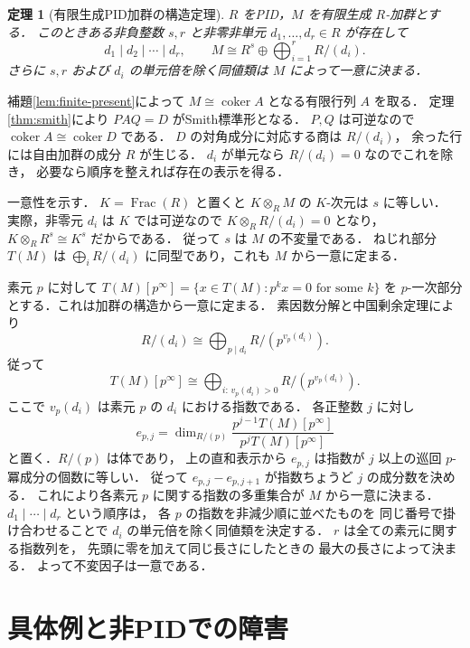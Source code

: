 \documentclass[a5paper,10pt,onecolumn]{jsarticle}
\makeatletter
\theoremstyle{mathnotetheorem}
\newtheorem{theorem}{定理}[section]
\renewcommand{\proofname}{証明}
\renewenvironment{proof}[1][\proofname]{%
  \par\pushQED{\qed}\normalfont\topsep4\p@\@plus2\p@\relax
  \trivlist\item[\hskip\labelsep\bfseries #1]\ignorespaces
}{\popQED\endtrivlist\@endpefalse}
\makeatother
\begin{document}
\begin{theorem}[有限生成PID加群の構造定理]\label{thm:module}
$R$ をPID，$M$ を有限生成 $R$-加群とする．
このときある非負整数 $s,r$ と非零非単元
$d_1,\dots,d_r\in R$ が存在して
\[
 d_1\mid d_2\mid\cdots\mid d_r,
 \qquad
 M\cong R^s\oplus
       \bigoplus_{i=1}^r R/(d_i).
\]
さらに $s,r$ および $d_i$ の単元倍を除く同値類は
$M$ によって一意に決まる．
\end{theorem}
\begin{proof}
補題\ref{lem:finite-present}によって
$M\cong\operatorname{coker}A$ となる有限行列 $A$ を取る．
定理\ref{thm:smith}により
$PAQ=D$ がSmith標準形となる．
$P,Q$ は可逆なので
$\operatorname{coker}A\cong\operatorname{coker}D$ である．
$D$ の対角成分に対応する商は $R/(d_i)$，
余った行には自由加群の成分 $R$ が生じる．
$d_i$ が単元なら $R/(d_i)=0$ なのでこれを除き，
必要なら順序を整えれば存在の表示を得る．

一意性を示す．
$K=\operatorname{Frac}(R)$ と置くと
$K\otimes_RM$ の $K$-次元は $s$ に等しい．
実際，非零元 $d_i$ は $K$ では可逆なので
$K\otimes_RR/(d_i)=0$ となり，
$K\otimes_RR^s\cong K^s$ だからである．
従って $s$ は $M$ の不変量である．
ねじれ部分 $T(M)$ は
$\bigoplus_iR/(d_i)$ に同型であり，これも $M$ から一意に定まる．

素元 $p$ に対して
$T(M)[p^\infty]
=\{x\in T(M):p^kx=0\text{ for some }k\}$
を $p$-一次部分とする．これは加群の構造から一意に定まる．
素因数分解と中国剰余定理により
\[
 R/(d_i)\cong
 \bigoplus_{p\mid d_i}R/(p^{v_p(d_i)}).
\]
従って
\[
 T(M)[p^\infty]\cong
 \bigoplus_{i:\,v_p(d_i)>0}R/(p^{v_p(d_i)}).
\]
ここで $v_p(d_i)$ は素元 $p$ の $d_i$ における指数である．
各正整数 $j$ に対し
\[
 e_{p,j}=
 \dim_{R/(p)}
 \frac{p^{j-1}T(M)[p^\infty]}
      {p^jT(M)[p^\infty]}
\]
と置く．$R/(p)$ は体であり，
上の直和表示から
$e_{p,j}$ は指数が $j$ 以上の巡回 $p$-冪成分の個数に等しい．
従って
$e_{p,j}-e_{p,j+1}$ が指数ちょうど $j$ の成分数を決める．
これにより各素元 $p$ に関する指数の多重集合が
$M$ から一意に決まる．
$d_1\mid\cdots\mid d_r$ という順序は，
各 $p$ の指数を非減少順に並べたものを
同じ番号で掛け合わせることで
$d_i$ の単元倍を除く同値類を決定する．
$r$ は全ての素元に関する指数列を，
先頭に零を加えて同じ長さにしたときの
最大の長さによって決まる．
よって不変因子は一意である．
\end{proof}

\section{具体例と非PIDでの障害}
\end{document}
